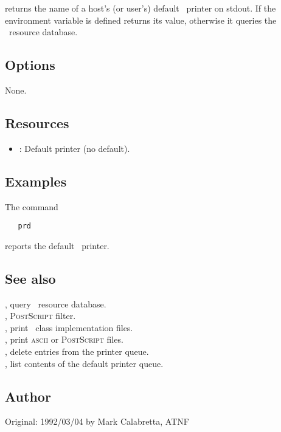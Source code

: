  returns the name of a host's (or user's) default \aipspp\ printer
on stdout.  If the  environment variable is defined 
returns its value, otherwise it queries the \aipspp\ resource database.

\subsection*{Options}

None.

\subsection*{Resources}

\begin{itemize}
\item
   : Default printer (no default).
\end{itemize}

\subsection*{Examples}

The command

\begin{verbatim}
   prd
\end{verbatim}

\noindent
reports the default \aipspp\ printer.

\subsection*{See also}

, query \aipspp\ resource database.\\
, \textsc{PostScript} filter.\\
, print \aipspp\ class implementation files.\\
, print \textsc{ascii} or \textsc{PostScript} files.\\
, delete entries from the printer queue.\\
, list contents of the default printer queue.

\subsection*{Author}

Original: 1992/03/04 by Mark Calabretta, ATNF

